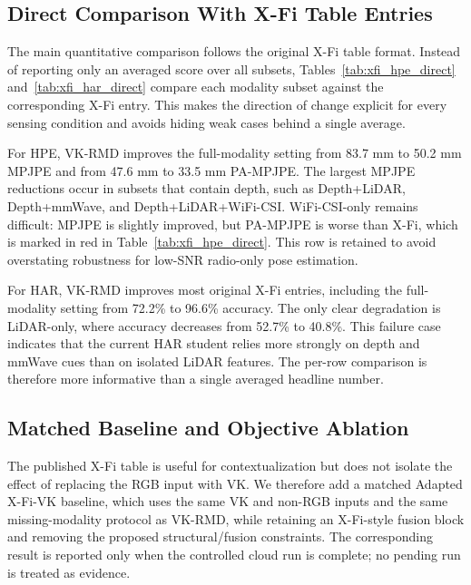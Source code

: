 ﻿\documentclass[journal]{IEEEtran}
\newcommand{\method}{VK-RMD}
\newcommand{\mpjpe}{MPJPE}
\newcommand{\pampjpe}{PA-MPJPE}
\begin{document}
\subsection{Direct Comparison With X-Fi Table Entries}
The main quantitative comparison follows the original X-Fi table format. Instead of reporting only an averaged score over all subsets, Tables~\ref{tab:xfi_hpe_direct} and~\ref{tab:xfi_har_direct} compare each modality subset against the corresponding X-Fi entry. This makes the direction of change explicit for every sensing condition and avoids hiding weak cases behind a single average.



For HPE, \method{} improves the full-modality setting from 83.7 mm to 50.2 mm \mpjpe{} and from 47.6 mm to 33.5 mm \pampjpe{}. The largest MPJPE reductions occur in subsets that contain depth, such as Depth+LiDAR, Depth+mmWave, and Depth+LiDAR+WiFi-CSI. WiFi-CSI-only remains difficult: MPJPE is slightly improved, but PA-MPJPE is worse than X-Fi, which is marked in red in Table~\ref{tab:xfi_hpe_direct}. This row is retained to avoid overstating robustness for low-SNR radio-only pose estimation.



For HAR, \method{} improves most original X-Fi entries, including the full-modality setting from 72.2\% to 96.6\% accuracy. The only clear degradation is LiDAR-only, where accuracy decreases from 52.7\% to 40.8\%. This failure case indicates that the current HAR student relies more strongly on depth and mmWave cues than on isolated LiDAR features. The per-row comparison is therefore more informative than a single averaged headline number.

\subsection{Matched Baseline and Objective Ablation}
The published X-Fi table is useful for contextualization but does not isolate the effect of replacing the RGB input with VK. We therefore add a matched Adapted X-Fi-VK baseline, which uses the same VK and non-RGB inputs and the same missing-modality protocol as \method{}, while retaining an X-Fi-style fusion block and removing the proposed structural/fusion constraints. The corresponding result is reported only when the controlled cloud run is complete; no pending run is treated as evidence.


\end{document}

